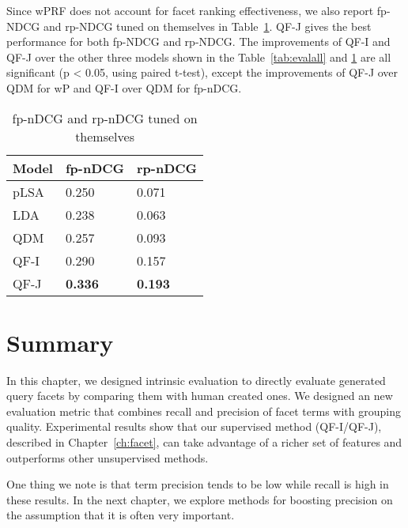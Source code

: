Since wPRF does not account for facet ranking effectiveness, we also report fp-NDCG and rp-NDCG tuned on themselves in Table~\ref{tab:evalallrank}. QF-J gives the best performance for both fp-NDCG and rp-NDCG.
The improvements of QF-I and QF-J over the other three models shown in the Table~\ref{tab:evalall} and \ref{tab:evalallrank} are all significant (p < 0.05, using paired t-test), except the improvements of QF-J over QDM for wP and QF-I over QDM for fp-nDCG.
\begin{table}[ht!]
\centering
\caption{fp-nDCG and rp-nDCG tuned on themselves}
\label{tab:evalallrank}
\begin{tabular}{|l|l|l|} \hline
Model &  fp-nDCG & rp-nDCG\\\hline
pLSA & 0.250 & 0.071\\
LDA &  0.238 & 0.063 \\
QDM & 0.257 & 0.093  \\
QF-I & 0.290 & 0.157\\
QF-J & \textbf{0.336} & \textbf{0.193}\\\hline
\end{tabular}
\end{table}

\section{Summary} \label{sec:ie-conclusions}
In this chapter, we designed intrinsic evaluation to directly evaluate generated query facets by comparing them with human created ones. We designed an new evaluation metric that combines recall and precision of facet terms with grouping quality. Experimental results show that our supervised method (QF-I/QF-J), described in Chapter~\ref{ch:facet}, can take advantage of a richer set of features and outperforms other unsupervised methods.

One thing we note is that term precision tends to be low while recall is high in these results. In the next chapter, we explore methods for boosting precision on the assumption that it is often very important.

